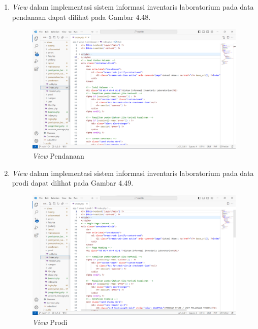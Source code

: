 \begin{enumerate}
  \item \textit{View} dalam implementasi sistem informasi inventaris laboratorium pada data pendanaan dapat dilihat pada Gambar 4.48.
        \begin{figure}
          \centering
          \includegraphics[width=0.82\linewidth]{konten//gambar/view pendanaan.png}
          \caption{\textit{View} Pendanaan}
          \label{fig:enter-label}
        \end{figure}

  \item \textit{View} dalam implementasi sistem informasi inventaris laboratorium pada data prodi dapat dilihat pada Gambar 4.49.
        \begin{figure}
          \centering
          \includegraphics[width=0.82\linewidth]{konten//gambar/view prodi.png}
          \caption{\textit{View} Prodi}
          \label{fig:enter-label}
        \end{figure}


\end{enumerate}
